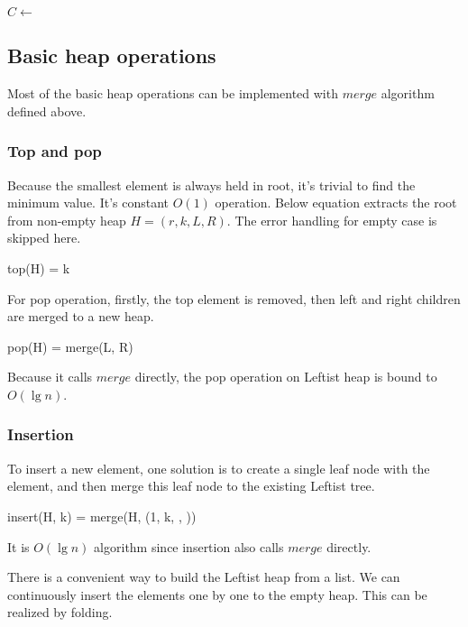 \documentclass{article}
\begin{document}
\begin{algorithmic}[1]
  \State $C \gets$ 
  \State {}
\EndFunction
\end{algorithmic}

\subsection{Basic heap operations}

Most of the basic heap operations can be implemented with $merge$
algorithm defined above.

\subsubsection{Top and pop}
Because the smallest element is always held in root, it's trivial
to find the minimum value. It's constant $O(1)$ operation. Below
equation extracts the root from non-empty heap $H = (r, k, L, R)$.
The error handling for empty case is skipped here.

\be
top(H) = k
\ee

For pop operation, firstly, the top element is removed, then
left and right children are merged to a new heap.

\be
pop(H) = merge(L, R)
\ee

Because it calls $merge$ directly, the pop operation on Leftist heap is bound
to $O(\lg n)$.

\subsubsection{Insertion}

To insert a new element, one solution is to create a single
leaf node with the element, and then merge this leaf node to
the existing Leftist tree.

\be
insert(H, k) = merge(H, (1, k, \phi, \phi))
\ee

It is $O(\lg n)$ algorithm since insertion also calls $merge$ directly.

There is a convenient way to build the Leftist heap from
a list. We can continuously insert the elements one by one
to the empty heap. This can be realized by folding.
\end{document}
